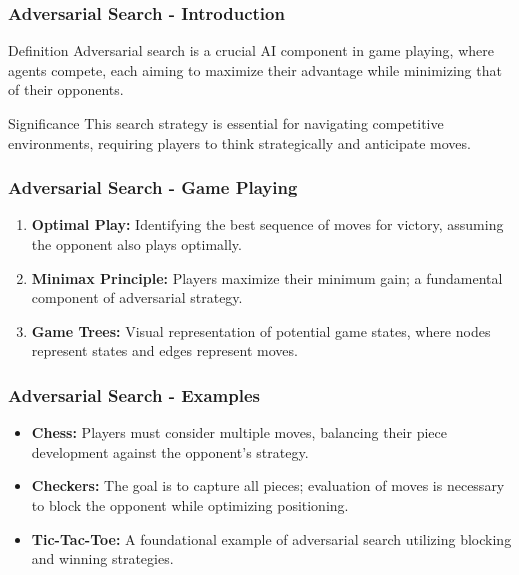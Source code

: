 \documentclass[aspectratio=169]{beamer}
\begin{document}
\begin{frame}[fragile]
    \frametitle{Adversarial Search - Introduction}
    \begin{block}{Definition}
        Adversarial search is a crucial AI component in game playing, where agents compete, each aiming to maximize their advantage while minimizing that of their opponents.
    \end{block}
    \begin{block}{Significance}
        This search strategy is essential for navigating competitive environments, requiring players to think strategically and anticipate moves.
    \end{block}
\end{frame}

\begin{frame}[fragile]
    \frametitle{Adversarial Search - Game Playing}
    \begin{enumerate}
        \item \textbf{Optimal Play:} Identifying the best sequence of moves for victory, assuming the opponent also plays optimally.
        \item \textbf{Minimax Principle:} Players maximize their minimum gain; a fundamental component of adversarial strategy.
        \item \textbf{Game Trees:} Visual representation of potential game states, where nodes represent states and edges represent moves.
    \end{enumerate}
\end{frame}

\begin{frame}[fragile]
    \frametitle{Adversarial Search - Examples}
    \begin{itemize}
        \item \textbf{Chess:} Players must consider multiple moves, balancing their piece development against the opponent's strategy.
        \item \textbf{Checkers:} The goal is to capture all pieces; evaluation of moves is necessary to block the opponent while optimizing positioning.
        \item \textbf{Tic-Tac-Toe:} A foundational example of adversarial search utilizing blocking and winning strategies.
    \end{itemize}
\end{frame}
\end{document}
